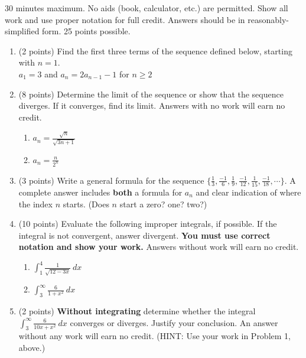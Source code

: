 \documentclass[12pt]{article}
\renewcommand{\emph}[1]{\textsf{\textbf{#1}}}
\newcommand{\ds}{\displaystyle}
\begin{document}
30 minutes maximum.  No aids (book, calculator, etc.) are permitted.  Show all work and use proper notation for full credit.  Answers should be in reasonably-simplified form.  25 points possible.

\begin{enumerate}
\item (2 points) Find the first three terms of the sequence defined below, starting with $n=1.$\\

\hspace{2in} $a_1=3$ and $a_n=2a_{n-1} -1$ for $n\geq 2$

\vspace{.75in}
\item (8 points) Determine the limit of the sequence or show that the sequence diverges. If it converges, find its limit. Answers with no work will earn no credit.
	\begin{enumerate}
	\item $a_n=\frac{\sqrt{n}}{\sqrt{3n+1}}$
	\vfill
	\item $a_n=\frac{n}{2^n}$
	\vfill
	
	\end{enumerate}


\item (3 points) Write a general formula for the sequence $\ds \{\frac{1}{3}, \frac{-1}{6}, \frac{1}{9}, \frac{-1}{12},\frac{ 1}{15}, \frac{-1}{18}, \cdots\}.$ A complete answer includes \emph{both} a formula for $a_n$ and clear indication of where the index $n$ starts. (Does $n$ start a zero? one? two?)
\vspace{.75in}

\newpage
\item (10 points) Evaluate the following improper integrals, if possible. If the integral is not convergent, answer divergent. \textbf{You must use correct notation and show your work.} Answers without work will earn no credit.
	\begin{enumerate}
	\item $\ds \int_1^4\frac{1}{\sqrt{12-3x}} \: dx$
	\vfill

	\item $\ds \int_3^\infty \frac{6}{1+x^2} \: dx$
	\vfill
	
	\end{enumerate}
\item (2 points) \textbf{Without integrating} determine whether the integral $\ds \int_3^\infty \frac{6}{10x+x^2} \: dx$ converges or diverges. Justify your conclusion. An answer without any work will earn no credit. (HINT: Use your work in Problem 1, above.)
\vfill

 

\end{enumerate}
\end{document}
